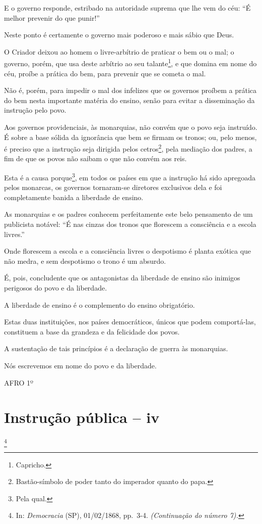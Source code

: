 E o governo responde, estribado na autoridade suprema que lhe vem do
céu: ``É melhor prevenir do que punir!''

Neste ponto é certamente o governo mais poderoso e mais sábio que Deus.

O Criador deixou ao homem o livre-arbítrio de praticar o bem ou o mal; o
governo, porém, que usa deste arbítrio ao seu talante\footnote{
  Capricho.}, e que domina em nome do céu, proíbe a prática do bem, para
prevenir que se cometa o mal.

Não é, porém, para impedir o mal dos infelizes que os governos proíbem a
prática do bem nesta importante matéria do ensino, senão para evitar a
disseminação da instrução pelo povo.

Aos governos providenciais, às monarquias, não convém que o povo seja
instruído. É sobre a base sólida da ignorância que bem se firmam os
tronos; ou, pelo menos, é preciso que a instrução seja dirigida pelos
cetros\footnote{Bastão-símbolo de poder tanto do imperador quanto do
  papa.}, pela mediação dos padres, a fim de que os povos não saibam o
que não convém aos reis.

Esta é a causa porque\footnote{Pela qual.}, em todos os países em que
a instrução há sido apregoada pelos monarcas, os governos tornaram-se
diretores exclusivos dela e foi completamente banida a liberdade de
ensino.

As monarquias e os padres conhecem perfeitamente este belo pensamento de
um publicista notável: ``É nas cinzas dos tronos que florescem a
consciência e a escola livres.''

Onde florescem a escola e a consciência livres o despotismo é planta
exótica que não medra, e sem despotismo o trono é um absurdo.

É, pois, concludente que os antagonistas da liberdade de ensino são
inimigos perigosos do povo e da liberdade.

A liberdade de ensino é o complemento do ensino obrigatório.

Estas duas instituições, nos países democráticos, únicos que podem
comportá-las, constituem a base da grandeza e da felicidade dos povos.

A sustentação de tais princípios é a declaração de guerra às monarquias.

Nós escrevemos em nome do povo e da liberdade.

AFRO 1º

\chapter{Instrução pública -- iv}\footnote{In: \emph{Democracia} (SP),
  01/02/1868, pp.~3-4. \emph{(Continuação do número 7).}}

